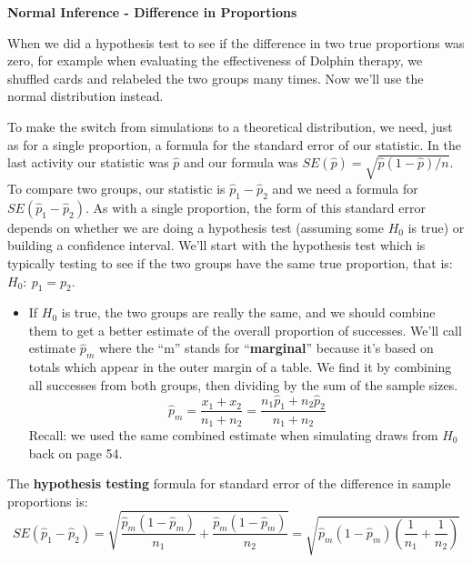 \def\theTopic{Difference in Proportions - Z }
\def\dayNum{23 }


\begin{center}
{\bf {\large \textbf{Normal Inference - Difference in Proportions}}}
\end{center}


When we did a hypothesis test to see if the difference in  two true
proportions was zero,  for example when evaluating the effectiveness
of Dolphin therapy, we shuffled cards and relabeled the two groups many
times. Now we'll use the normal distribution instead.  
  

 To make the switch from simulations to a theoretical distribution,
 we need, just as for a single proportion, a formula for the standard
 error of our statistic.  In the last activity our statistic was
 $\widehat{p}$ and our formula was $SE(\widehat{p}) =
 \sqrt{\widehat{p}(1-\widehat{p})/n}$.  To compare two groups, our 
statistic is $\widehat{p}_1 - \widehat{p}_2$ and we need a formula for
$SE(\widehat{p}_1 - \widehat{p}_2)$. As with a single proportion, the
form of this standard error depends on whether we are doing a
hypothesis test (assuming some $H_0$ is true) or building a confidence
interval.  We'll start with the hypothesis test which is typically
testing to see if the two groups have the same true proportion, that
is:  $H_0:\ p_1 = p_2$.
 \begin{itemize}
 \item If $H_0$ is true, the two groups are really the same, and we
   should combine them to get a better estimate of the overall
   proportion of successes. We'll call estimate $\widehat{p}_m$ where
   the ``m'' stands for ``{\bf marginal}'' because it's
   based on totals which appear in the outer margin of a table.  We
   find it by combining all successes from both 
   groups, then dividing by the sum of the sample sizes. 
  $$\widehat{p}_m = \frac{x_1 + x_2}{n_1+n_2} = \frac{n_1\widehat{p}_1
    + n_2\widehat{p}_2}{n_1 + n_2}$$ 
  Recall:  we used the same combined estimate when simulating draws
  from $H_0$ back on page 54.
 \end{itemize}

 The {\bf hypothesis testing} formula for standard error of the difference in sample proportions is:
 $$SE(\widehat{p}_1 - \widehat{p}_2) =
 \sqrt{\frac{\widehat{p}_m(1-\widehat{p}_m)}{n_1} +
   \frac{\widehat{p}_m(1-\widehat{p}_m)}{n_2}} =
  \sqrt{\widehat{p}_m(1-\widehat{p}_m)\left(\frac{1}{n_1} +
   \frac{1}{n_2}\right)}$$



